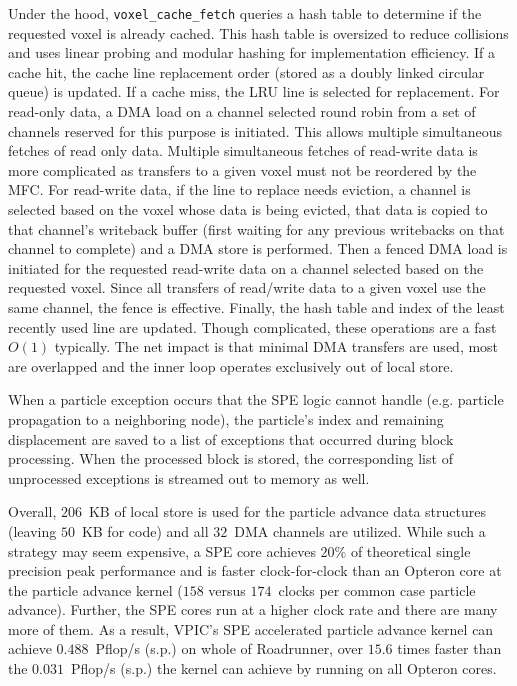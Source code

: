 \documentclass[journal,twoside]{IEEEtran}
\begin{document}
Under the hood, \verb+voxel_cache_fetch+ queries a hash table to
determine if the requested voxel is already cached.  This hash table
is oversized to reduce collisions and uses linear probing and modular
hashing for implementation efficiency.  If a cache hit, the cache line
replacement order (stored as a doubly linked circular queue) is
updated.  If a cache miss, the LRU line is selected for replacement.
For read-only data, a DMA load on a channel selected round robin from
a set of channels reserved for this purpose is initiated.  This allows
multiple simultaneous fetches of read only data.  Multiple
simultaneous fetches of read-write data is more complicated as
transfers to a given voxel must not be reordered by the MFC.  For
read-write data, if the line to replace needs eviction, a channel is
selected based on the voxel whose data is being evicted, that data is
copied to that channel's writeback buffer (first waiting for any
previous writebacks on that channel to complete) and a DMA store is
performed.  Then a fenced DMA load is initiated for the requested
read-write data on a channel selected based on the requested voxel.
Since all transfers of read/write data to a given voxel use the same
channel, the fence is effective.  Finally, the hash table and index of
the least recently used line are updated.  Though complicated, these
operations are a fast $O(1)$ typically.  The net impact is that
minimal DMA transfers are used, most are overlapped and the inner loop
operates exclusively out of local store.

When a particle exception occurs that the SPE logic cannot handle
(e.g. particle propagation to a neighboring node), the particle's
index and remaining displacement are saved to a list of exceptions
that occurred during block processing.  When the processed block is
stored, the corresponding list of unprocessed exceptions is streamed
out to memory as well.

Overall, $206$~KB of local store is used for the particle advance data
structures (leaving $50$~KB for code) and all $32$~DMA channels are
utilized.  While such a strategy may seem expensive, a SPE core
achieves $20\%$ of theoretical single precision peak performance and
is faster clock-for-clock than an Opteron core at the particle advance
kernel ($158$ versus $174$~clocks per common case particle advance).
Further, the SPE cores run at a higher clock rate and there are many
more of them.  As a result, VPIC's SPE accelerated particle advance
kernel can achieve $0.488$~Pflop/s (s.p.) on whole of Roadrunner, over
$15.6$ times faster than the $0.031$~Pflop/s (s.p.) the kernel can
achieve by running on all Opteron cores.
\end{document}
